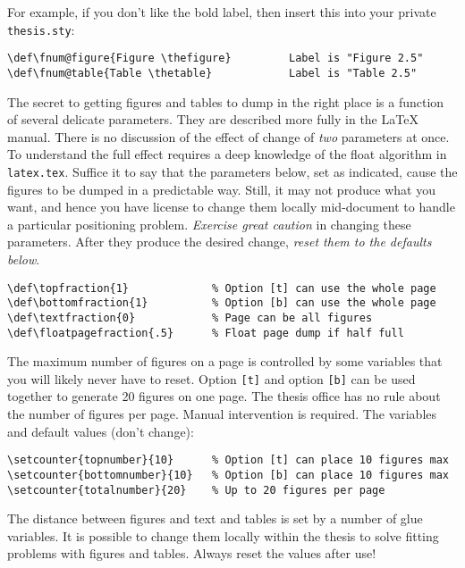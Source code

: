 For example, if you don't like the bold label, then insert this into
your private {\tt thesis.sty}:
\footnotesize\begin{verbatim}
\def\fnum@figure{Figure \thefigure}         Label is "Figure 2.5"
\def\fnum@table{Table \thetable}            Label is "Table 2.5"
\end{verbatim}\normalsize

The secret to getting figures and tables to dump in the right place is a
function of several delicate parameters. They are described more fully
in the \LaTeX{} manual. There is no discussion of the effect of change
of {\em two} parameters at once. To understand the full effect requires
a deep knowledge of the float algorithm in {\tt latex.tex}. Suffice it
to say that the parameters below, set as indicated, cause the figures to
be dumped in a predictable way. Still, it may not produce what you want,
and hence you have license to change them locally mid-document to handle
a particular positioning problem. {\em Exercise great caution} in
changing these parameters. After they produce the desired change, {\em
reset them to the defaults below}.

\footnotesize\begin{verbatim}
\def\topfraction{1}             % Option [t] can use the whole page
\def\bottomfraction{1}          % Option [b] can use the whole page
\def\textfraction{0}            % Page can be all figures
\def\floatpagefraction{.5}      % Float page dump if half full
\end{verbatim}\normalsize


The maximum number of figures on a page is controlled by some variables
that you will likely never have to reset. Option \verb"[t]" and option
\verb"[b]" can be used together to generate 20 figures on one page.
The thesis office has no rule about the number of figures per page.
Manual intervention is required. The variables and default values (don't
change):

\footnotesize\begin{verbatim}
\setcounter{topnumber}{10}      % Option [t] can place 10 figures max
\setcounter{bottomnumber}{10}   % Option [b] can place 10 figures max
\setcounter{totalnumber}{20}    % Up to 20 figures per page
\end{verbatim}\normalsize

The distance between figures and text and tables is set by a number of
glue variables. It is possible to change them locally within the thesis
to solve fitting problems with figures and tables. Always reset the
values after use!

